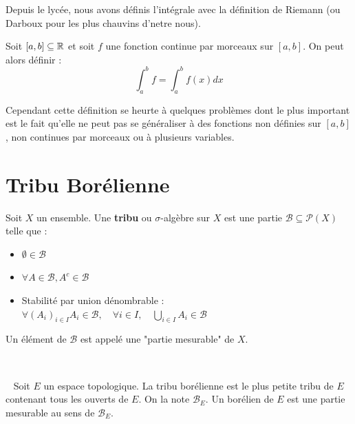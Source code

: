 
\minitoc  %

Depuis le lycée, nous avons définis l'intégrale avec la définition de Riemann (ou Darboux pour les plus chauvins d'netre nous).

\begin{definition}
    Soit $[a,b] \subseteq \mathbb{R} $ et soit $f$ une fonction continue par morceaux sur $[a,b]$. On peut alors définir :
        \[ \int_{a}^{b} f = \int_{a}^{b} f(x) dx \]
\end{definition}

Cependant cette définition se heurte à quelques problèmes dont le plus important est le fait 
qu'elle ne peut pas se généraliser à des fonctions non définies sur $[a,b]$, non continues par morceaux ou à plusieurs variables.


\section{Tribu Borélienne}

\begin{definition}[Tribu]
	Soit $X$ un ensemble. Une \textbf{tribu} ou $\sigma$-algèbre sur $X$ est une partie 
	$\mathcal{B} \subseteq \mathcal{P}(X)$ telle que :
	\begin{itemize} 
		\item $ \emptyset \in \mathcal{B} $
		\item $ \forall A \in \mathcal{B}, A^c \in \mathcal{B} $
		\item Stabilité par union dénombrable : 
			$ \forall (A_i)_{i \in I}  A_i \in \mathcal{B}, \quad \forall i \in I, \quad \bigcup_{i \in I} A_i \in \mathcal{B} $
	\end{itemize}
Un élément de $\mathcal{B}$ est appelé une "partie mesurable" de $X$.
\end{definition} 

\begin{definition} 
	Soit $E$ un espace topologique. La tribu borélienne est le plus petite tribu de $E$ contenant tous les ouverts de $E$. On la note $\mathcal{B}_E$. Un borélien de $E$ est une partie mesurable au sens de $\mathcal{B}_E$.
\end{definition}

